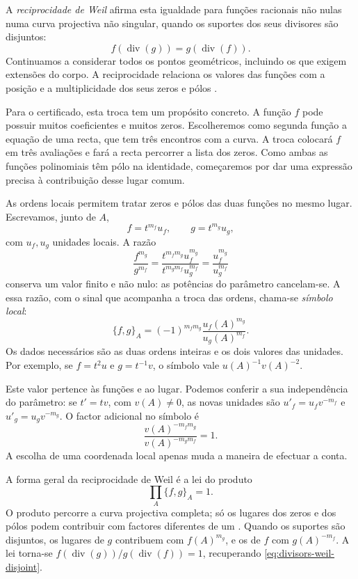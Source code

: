 A \emph{reciprocidade de Weil} afirma esta igualdade para funções
racionais não nulas numa curva projectiva não singular, quando os
suportes dos seus divisores são disjuntos:
\begin{equation}
 f(\operatorname{div}(g))=g(\operatorname{div}(f)).
 \label{eq:divisors-weil-disjoint}
\end{equation}
Continuamos a considerar todos os pontos geométricos, incluindo os
que exigem extensões do corpo. A reciprocidade relaciona os valores
das funções com a posição e a multiplicidade dos seus zeros e pólos
\cite{osipov-zhu-reciprocity}.

Para o certificado, esta troca tem um propósito concreto. A função
\(f\) pode possuir muitos coeficientes e muitos zeros. Escolheremos
como segunda função a equação de uma recta, que tem três encontros
com a curva. A troca colocará \(f\) em três avaliações e fará a
recta percorrer a lista dos zeros. Como ambas as funções polinomiais
têm pólo na identidade, começaremos por dar uma expressão precisa à
contribuição desse lugar comum.


As ordens locais permitem tratar zeros e pólos das duas funções no
mesmo lugar. Escrevamos, junto de \(A\),
\[
 f=t^{m_f}u_f,\qquad g=t^{m_g}u_g,
\]
com \(u_f,u_g\) unidades locais. A razão
\[
 \frac{f^{m_g}}{g^{m_f}}
 =\frac{t^{m_fm_g}u_f^{m_g}}{t^{m_gm_f}u_g^{m_f}}
 =\frac{u_f^{m_g}}{u_g^{m_f}}
\]
conserva um valor finito e não nulo: as potências do parâmetro
cancelam-se. A essa razão, com o sinal que acompanha a troca das
ordens, chama-se \emph{símbolo local}:
\begin{equation}
 \{f,g\}_A=(-1)^{m_fm_g}
       \frac{u_f(A)^{m_g}}{u_g(A)^{m_f}}.
 \label{eq:fcmp-local-symbol}
\end{equation}
Os dados necessários são as duas ordens inteiras e os dois valores
das unidades. Por exemplo, se \(f=t^2u\) e \(g=t^{-1}v\),
o símbolo vale \(u(A)^{-1}v(A)^{-2}\).

Este valor pertence às funções e ao lugar. Podemos conferir a sua
independência do parâmetro: se \(t'=tv\), com \(v(A)\ne0\),
as novas unidades são \(u'_f=u_fv^{-m_f}\) e
\(u'_g=u_gv^{-m_g}\). O factor adicional no símbolo é
\[
 \frac{v(A)^{-m_fm_g}}{v(A)^{-m_gm_f}}=1.
\]
A escolha de uma coordenada local apenas muda a maneira de efectuar
a conta.

A forma geral da reciprocidade de Weil é a lei do produto
\begin{equation}
 \prod_A\{f,g\}_A=1.
 \label{eq:divisors-weil-product}
\end{equation}
O produto percorre a curva projectiva completa; só os lugares dos
zeros e dos pólos podem contribuir com factores diferentes de um
\cite{osipov-zhu-reciprocity}. Quando os suportes são disjuntos,
os lugares de \(g\) contribuem com \(f(A)^{m_g}\), e os de
\(f\) com \(g(A)^{-m_f}\). A lei torna-se
\(f(\operatorname{div}(g))/g(\operatorname{div}(f))=1\),
recuperando \eqref{eq:divisors-weil-disjoint}.

